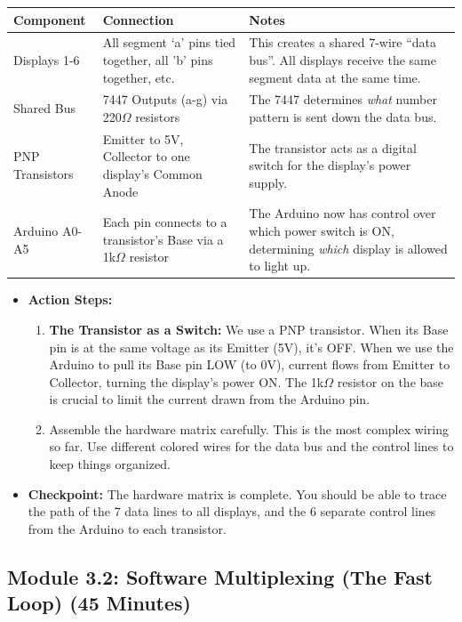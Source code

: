 \documentclass[11pt,a4paper]{article}
\begin{document}
\begin{table}[h]
\centering
\begin{tabular}{lp{4cm}p{6.5cm}}
\toprule
\textbf{Component} & \textbf{Connection} & \textbf{Notes} \\
\midrule
Displays 1-6 & All segment `a' pins tied together, all 'b' pins together, etc. & This creates a shared 7-wire ``data bus''. All displays receive the same segment data at the same time. \\
Shared Bus & 7447 Outputs (a-g) via 220$\Omega$ resistors & The 7447 determines \emph{what} number pattern is sent down the data bus. \\
PNP Transistors & Emitter to 5V, Collector to one display's Common Anode & The transistor acts as a digital switch for the display's power supply. \\
Arduino A0-A5 & Each pin connects to a transistor's Base via a 1k$\Omega$ resistor & The Arduino now has control over which power switch is ON, determining \emph{which} display is allowed to light up. \\
\bottomrule
\end{tabular}
\end{table}

\begin{itemize}
    \item \textbf{Action Steps:}
    \begin{enumerate}[label=\arabic*.]
        \item \textbf{The Transistor as a Switch:} We use a PNP transistor. When its Base pin is at the same voltage as its Emitter (5V), it's OFF. When we use the Arduino to pull its Base pin LOW (to 0V), current flows from Emitter to Collector, turning the display's power ON. The 1k$\Omega$ resistor on the base is crucial to limit the current drawn from the Arduino pin.
        \item Assemble the hardware matrix carefully. This is the most complex wiring so far. Use different colored wires for the data bus and the control lines to keep things organized.
    \end{enumerate}
    \item \textbf{Checkpoint:} The hardware matrix is complete. You should be able to trace the path of the 7 data lines to all displays, and the 6 separate control lines from the Arduino to each transistor.
\end{itemize}
\newpage
\subsection*{Module 3.2: Software Multiplexing (The Fast Loop) (45 Minutes)}
\end{document}
